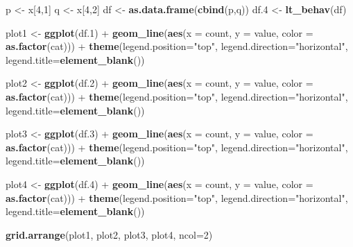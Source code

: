 \documentclass[]{article}
\newenvironment{Shaded}{\begin{snugshade}}{\end{snugshade}}
\newcommand{\KeywordTok}[1]{\textcolor[rgb]{0.13,0.29,0.53}{\textbf{{#1}}}}
\newcommand{\DataTypeTok}[1]{\textcolor[rgb]{0.13,0.29,0.53}{{#1}}}
\newcommand{\DecValTok}[1]{\textcolor[rgb]{0.00,0.00,0.81}{{#1}}}
\newcommand{\FloatTok}[1]{\textcolor[rgb]{0.00,0.00,0.81}{{#1}}}
\newcommand{\StringTok}[1]{\textcolor[rgb]{0.31,0.60,0.02}{{#1}}}
\newcommand{\NormalTok}[1]{{#1}}
\begin{document}
\begin{Shaded}
\begin{Highlighting}[]
\NormalTok{p <-}\StringTok{ }\NormalTok{x[}\DecValTok{4}\NormalTok{,}\DecValTok{1}\NormalTok{]}
\NormalTok{q <-}\StringTok{ }\NormalTok{x[}\DecValTok{4}\NormalTok{,}\DecValTok{2}\NormalTok{]}
\NormalTok{df <-}\StringTok{ }\KeywordTok{as.data.frame}\NormalTok{(}\KeywordTok{cbind}\NormalTok{(p,q))}
\NormalTok{df}\FloatTok{.4} \NormalTok{<-}\StringTok{ }\KeywordTok{lt_behav}\NormalTok{(df)}


\NormalTok{plot1 <-}\StringTok{ }\KeywordTok{ggplot}\NormalTok{(df}\FloatTok{.1}\NormalTok{) +}\StringTok{ }
\StringTok{         }\KeywordTok{geom_line}\NormalTok{(}\KeywordTok{aes}\NormalTok{(}\DataTypeTok{x =} \NormalTok{count, }\DataTypeTok{y =} \NormalTok{value, }\DataTypeTok{color =} \KeywordTok{as.factor}\NormalTok{(cat))) +}\StringTok{ }
\StringTok{         }\KeywordTok{theme}\NormalTok{(}\DataTypeTok{legend.position=}\StringTok{"top"}\NormalTok{, }\DataTypeTok{legend.direction=}\StringTok{"horizontal"}\NormalTok{, }\DataTypeTok{legend.title=}\KeywordTok{element_blank}\NormalTok{()) }

\NormalTok{plot2 <-}\StringTok{ }\KeywordTok{ggplot}\NormalTok{(df}\FloatTok{.2}\NormalTok{) +}\StringTok{ }
\StringTok{         }\KeywordTok{geom_line}\NormalTok{(}\KeywordTok{aes}\NormalTok{(}\DataTypeTok{x =} \NormalTok{count, }\DataTypeTok{y =} \NormalTok{value, }\DataTypeTok{color =} \KeywordTok{as.factor}\NormalTok{(cat))) +}\StringTok{ }
\StringTok{         }\KeywordTok{theme}\NormalTok{(}\DataTypeTok{legend.position=}\StringTok{"top"}\NormalTok{, }\DataTypeTok{legend.direction=}\StringTok{"horizontal"}\NormalTok{, }\DataTypeTok{legend.title=}\KeywordTok{element_blank}\NormalTok{()) }

\NormalTok{plot3 <-}\StringTok{ }\KeywordTok{ggplot}\NormalTok{(df}\FloatTok{.3}\NormalTok{) +}\StringTok{ }
\StringTok{         }\KeywordTok{geom_line}\NormalTok{(}\KeywordTok{aes}\NormalTok{(}\DataTypeTok{x =} \NormalTok{count, }\DataTypeTok{y =} \NormalTok{value, }\DataTypeTok{color =} \KeywordTok{as.factor}\NormalTok{(cat))) +}\StringTok{ }
\StringTok{         }\KeywordTok{theme}\NormalTok{(}\DataTypeTok{legend.position=}\StringTok{"top"}\NormalTok{, }\DataTypeTok{legend.direction=}\StringTok{"horizontal"}\NormalTok{, }\DataTypeTok{legend.title=}\KeywordTok{element_blank}\NormalTok{()) }

\NormalTok{plot4 <-}\StringTok{ }\KeywordTok{ggplot}\NormalTok{(df}\FloatTok{.4}\NormalTok{) +}\StringTok{ }
\StringTok{         }\KeywordTok{geom_line}\NormalTok{(}\KeywordTok{aes}\NormalTok{(}\DataTypeTok{x =} \NormalTok{count, }\DataTypeTok{y =} \NormalTok{value, }\DataTypeTok{color =} \KeywordTok{as.factor}\NormalTok{(cat))) +}\StringTok{ }
\StringTok{         }\KeywordTok{theme}\NormalTok{(}\DataTypeTok{legend.position=}\StringTok{"top"}\NormalTok{, }\DataTypeTok{legend.direction=}\StringTok{"horizontal"}\NormalTok{, }\DataTypeTok{legend.title=}\KeywordTok{element_blank}\NormalTok{()) }

\KeywordTok{grid.arrange}\NormalTok{(plot1, plot2, plot3, plot4, }\DataTypeTok{ncol=}\DecValTok{2}\NormalTok{)}
\end{Highlighting}
\end{Shaded}
\end{document}
